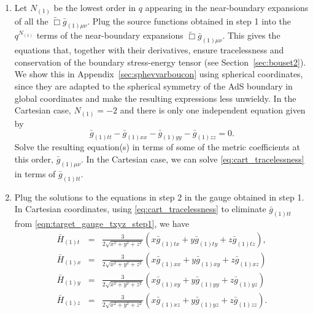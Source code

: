 \documentclass[a4paper,11pt]{article}
\numberwithin{equation}{section}
\begin{document}
\begin{enumerate}
\item Let $N_{(1)}$ be the lowest order in $q$ appearing in the near-boundary expansions of all the $\tilde{\Box}\bar{g}_{(1)\mu\nu}$. Plug the source functions obtained in step 1 into the $q^{N_{(1)}}$ terms of the near-boundary expansions $\tilde{\Box}\bar{g}_{(1)\mu\nu}$. This gives the equations that, together with their derivatives, ensure tracelessness and conservation of the boundary stress-energy tensor (see  Section~\ref{sec:bouset2}). We show this in Appendix~\ref{sec:sphevvarboucon} using spherical coordinates, since they are adapted to the spherical symmetry of the AdS boundary in global coordinates and make the resulting expressions less unwieldy.
In the Cartesian case, $N_{(1)}=-2$ and there is only one independent equation given by
\begin{equation}
\label{eq:cart_tracelessness}
\bar{g}_{(1)tt}-\bar{g}_{(1)xx}-\bar{g}_{(1)yy}-\bar{g}_{(1)zz}=0.
\end{equation}
Solve the resulting equation(s) in terms of some of the metric coefficients at this order, $\bar g_{(1)\mu\nu}$. In the Cartesian case, we can solve \eqref{eq:cart_tracelessness} in terms of $\bar g_{(1)tt}$.

\item Plug the solutions to the equations in step 2 in the gauge obtained in step 1.
In Cartesian coordinates, using \eqref{eq:cart_tracelessness} to eliminate $\bar{g}_{(1)tt}$ from \eqref{eqn:target_gauge_txyz_step1}, we have
\begin{eqnarray}\label{eqn:target_gauge_txyz}
\bar{H}_{(1)t}&=&\frac{3}{2\sqrt{x^2+y^2+z^2}}(x \bar{g}_{(1)tx}+y\bar{g}_{(1)ty}+z\bar{g}_{(1)tz}),\nonumber\\
\bar{H}_{(1)x}&=&\frac{3}{2\sqrt{x^2+y^2+z^2}}(x \bar{g}_{(1)xx}+y\bar{g}_{(1)xy}+z\bar{g}_{(1)xz}) \nonumber \\
\bar{H}_{(1)y}&=&\frac{3}{2\sqrt{x^2+y^2+z^2}}(x \bar{g}_{(1)xy}+y\bar{g}_{(1)yy}+z\bar{g}_{(1)yz}) \nonumber \\
\bar{H}_{(1)z}&=&\frac{3}{2\sqrt{x^2+y^2+z^2}}(x \bar{g}_{(1)xz}+y\bar{g}_{(1)yz}+z\bar{g}_{(1)zz}).
\end{eqnarray}
\end{enumerate}
\end{document}

